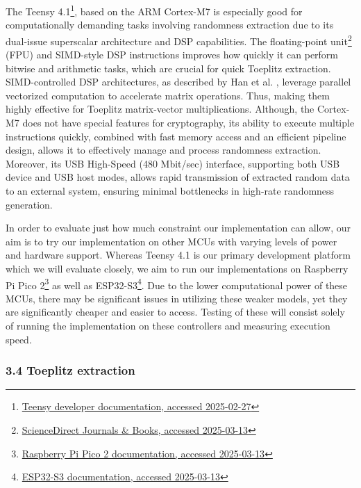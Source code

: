 \documentclass{sigchi}
\begin{document}
The Teensy 4.1\footnote{\href{https://www.pjrc.com/store/teensy41.html}{Teensy developer documentation, accessed 2025-02-27}}, based on the ARM Cortex-M7 is especially good for computationally demanding tasks involving randomness extraction due to its dual-issue superscalar architecture and DSP capabilities. The floating-point unit\footnote{\href{https://www.sciencedirect.com/topics/computer-science/floating-point-unit}{ScienceDirect Journals \& Books, accessed 2025-03-13}} (FPU) and SIMD-style DSP instructions improves how quickly it can perform bitwise and arithmetic tasks, which are crucial for quick Toeplitz extraction. SIMD-controlled DSP architectures, as described by Han et al. \cite{simd-dsp}, leverage parallel vectorized computation to accelerate matrix operations. Thus, making them highly effective for Toeplitz matrix-vector multiplications. Although, the Cortex-M7 does not have special features for cryptography, its ability to execute multiple instructions quickly, combined with fast memory access and an efficient pipeline design, allows it to effectively manage and process randomness extraction. Moreover, its USB High-Speed (480 Mbit/sec) interface, supporting both USB device and USB host modes, allows rapid transmission of extracted random data to an external system, ensuring minimal bottlenecks in high-rate randomness generation.

In order to evaluate just how much constraint our implementation can allow, our aim is to try our implementation on other MCUs with varying levels of power and hardware support. Whereas Teensy 4.1 is our primary development platform which we will evaluate closely, we aim to run our implementations on Raspberry Pi Pico 2\footnote{\href{https://datasheets.raspberrypi.com/pico/pico-2-product-brief.pdf}{Raspberry Pi Pico 2 documentation, accessed 2025-03-13}} as well as ESP32-S3\footnote{\href{https://www.espressif.com/sites/default/files/documentation/esp32-s3_datasheet_en.pdf}{ESP32-S3 documentation, accessed 2025-03-13}}. Due to the lower computational power of these MCUs, there may be significant issues in utilizing these weaker models, yet they are significantly cheaper and easier to access. Testing of these will consist solely of running the implementation on these controllers and measuring execution speed.

\subsubsection{\texorpdfstring{3.4 Toeplitz extraction }{3.4 Toeplitz extraction }}\label{toeplitz-extraction}
\end{document}
